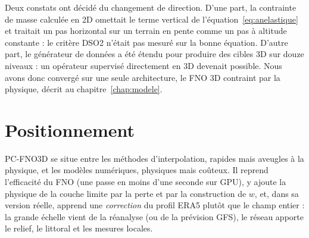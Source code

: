 Deux constats ont décidé du changement de direction. D'une part, la contrainte de masse calculée
en 2D omettait le terme vertical de l'équation~\eqref{eq:anelastique} et traitait un pas
horizontal sur un terrain en pente comme un pas à altitude constante : le critère DSO2 n'était pas
mesuré sur la bonne équation. D'autre part, le générateur de données a été étendu pour produire des
cibles 3D sur douze niveaux : un opérateur supervisé directement en 3D devenait possible. Nous
avons donc convergé sur une seule architecture, le FNO 3D contraint par la physique, décrit au
chapitre~\ref{chap:modele}.

\section{Positionnement}
PC-FNO3D se situe entre les méthodes d'interpolation, rapides mais aveugles à la physique, et les
modèles numériques, physiques mais coûteux. Il reprend l'efficacité du FNO (une passe en moins
d'une seconde sur GPU), y ajoute la physique de la couche limite par la perte et par la
construction de $w$, et, dans sa version réelle, apprend une \emph{correction} du profil ERA5 plutôt
que le champ entier : la grande échelle vient de la réanalyse (ou de la prévision GFS), le réseau
apporte le relief, le littoral et les mesures locales.
